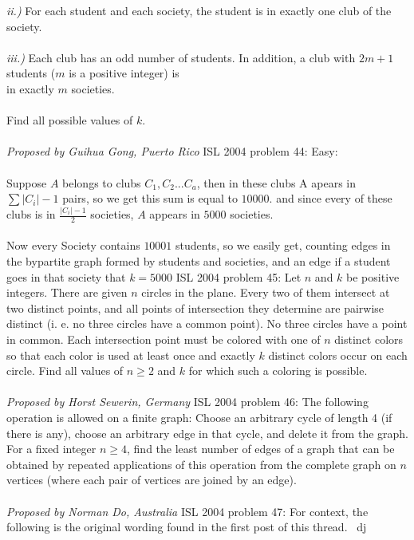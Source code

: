 \textit{ii.)} For each student and each society, the student is in exactly one club of the society. \\\\
\textit{iii.)} Each club has an odd number of students. In addition, a club with ${2m+1}$ students ($m$ is a positive integer) is \\
in exactly $m$ societies. \\\\
Find all possible values of $k$. \\\\
\textit{Proposed by Guihua Gong, Puerto Rico} 
ISL 2004 problem 44:  Easy: \\\\
Suppose $A$ belongs to clubs $C_1,C_2...C_a$, then in these clubs A apears in $\sum|C_i|-1$ pairs, so we get this sum is equal to $10000$. and since every of these clubs is in $\frac{|C_i|-1}{2}$ societies, $A$ appears in $5000$ societies. \\\\
Now every Society contains $10001$ students, so we easily get, counting edges in the bypartite graph formed by students and societies, and an edge if a student goes in that society that $k=5000$ 
ISL 2004 problem 45:  Let ${n}$ and $k$ be positive integers. There are given ${n}$ circles in the plane. Every two of them intersect at two distinct points, and all points of intersection they determine are pairwise distinct (i. e. no three circles have a common point). No three circles have a point in common. Each intersection point must be colored with one of $n$ distinct colors so that each color is used at least once and exactly $k$ distinct colors occur on each circle. Find all values of $n\geq 2$ and $k$ for which such a coloring is possible. \\\\
\textit{Proposed by Horst Sewerin, Germany} 
ISL 2004 problem 46:  The following operation is allowed on a finite graph: Choose an arbitrary cycle of length 4 (if there is any), choose an arbitrary edge in that cycle, and delete it from the graph. For a fixed integer ${n\ge 4}$, find the least number of edges of a graph that can be obtained by repeated applications of this operation from the complete graph on $n$ vertices (where each pair of vertices are joined by an edge). \\\\
\textit{Proposed by Norman Do, Australia} 
ISL 2004 problem 47:  For context, the following is the original wording found in the first post of this thread. ~dj

